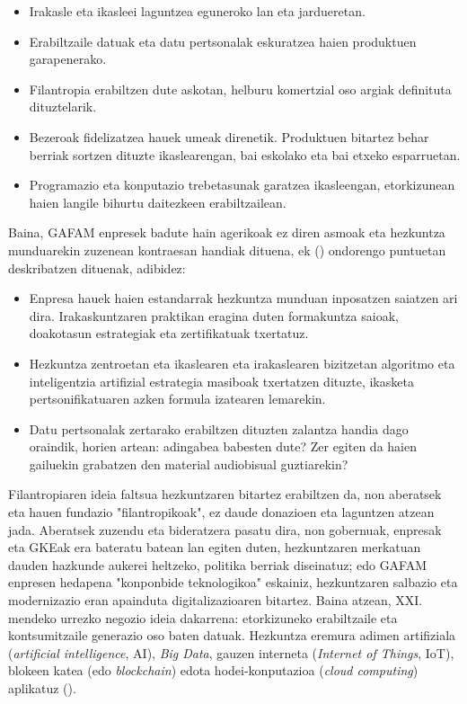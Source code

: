 \begin{itemize}
    \item Irakasle eta ikasleei laguntzea eguneroko lan eta jardueretan.
    \item Erabiltzaile datuak eta datu pertsonalak eskuratzea haien produktuen garapenerako.
    \item Filantropia erabiltzen dute askotan, helburu komertzial oso argiak definituta dituztelarik.
    \item Bezeroak fidelizatzea hauek umeak direnetik. Produktuen bitartez behar berriak sortzen dituzte ikaslearengan, bai eskolako eta bai etxeko esparruetan.
    \item Programazio eta konputazio trebetasunak garatzea ikasleengan, etorkizunean haien langile bihurtu daitezkeen erabiltzailean.
\end{itemize}

Baina, GAFAM enpresek badute hain agerikoak ez diren asmoak eta hezkuntza munduarekin zuzenean kontraesan handiak dituena, \citeauthor{herranz2018gafam}ek (\citeyear{herranz2018gafam}) ondorengo puntuetan deskribatzen dituenak, adibidez:

\begin{itemize}
    \item Enpresa hauek haien estandarrak hezkuntza munduan inposatzen saiatzen ari dira. Irakaskuntzaren praktikan eragina duten formakuntza saioak, doakotasun estrategiak eta zertifikatuak txertatuz.
    \item Hezkuntza zentroetan eta ikaslearen eta irakaslearen bizitzetan algoritmo eta inteligentzia artifizial estrategia masiboak txertatzen dituzte, ikasketa pertsonifikatuaren azken formula izatearen lemarekin.
    \item Datu pertsonalak zertarako erabiltzen dituzten zalantza handia dago oraindik, horien artean: adingabea babesten dute? Zer egiten da haien gailuekin grabatzen den material audiobisual guztiarekin?
\end{itemize}

Filantropiaren ideia faltsua hezkuntzaren bitartez erabiltzen da, non aberatsek eta hauen fundazio "filantropikoak", ez daude donazioen eta laguntzen atzean jada. Aberatsek zuzendu eta bideratzera pasatu dira, non gobernuak, enpresak eta GKEak era bateratu batean lan egiten duten, hezkuntzaren merkatuan dauden hazkunde aukerei heltzeko, politika berriak diseinatuz; edo GAFAM enpresen hedapena "konponbide teknologikoa" eskainiz, hezkuntzaren salbazio eta modernizazio eran apainduta digitalizazioaren bitartez. Baina atzean, XXI. mendeko urrezko negozio ideia dakarrena: etorkizuneko erabiltzaile eta kontsumitzaile generazio oso baten datuak. Hezkuntza eremura adimen artifiziala (\textit{artificial intelligence}, AI), \textit{Big Data}, gauzen interneta (\textit{Internet of Things}, IoT), blokeen katea (edo \textit{blockchain}) edota hodei-konputazioa (\textit{cloud computing}) aplikatuz (\cite{diez2022invasion}).

